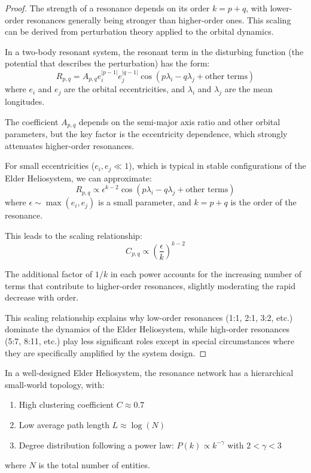 \begin{proof}
The strength of a resonance depends on its order $k = p + q$, with lower-order resonances generally being stronger than higher-order ones. This scaling can be derived from perturbation theory applied to the orbital dynamics.

In a two-body resonant system, the resonant term in the disturbing function (the potential that describes the perturbation) has the form:
\begin{equation}
R_{p,q} = A_{p,q} e_i^{|p-1|} e_j^{|q-1|} \cos(p\lambda_i - q\lambda_j + \text{other terms})
\end{equation}
where $e_i$ and $e_j$ are the orbital eccentricities, and $\lambda_i$ and $\lambda_j$ are the mean longitudes.

The coefficient $A_{p,q}$ depends on the semi-major axis ratio and other orbital parameters, but the key factor is the eccentricity dependence, which strongly attenuates higher-order resonances.

For small eccentricities ($e_i, e_j \ll 1$), which is typical in stable configurations of the Elder Heliosystem, we can approximate:
\begin{equation}
R_{p,q} \propto \epsilon^{k-2} \cos(p\lambda_i - q\lambda_j + \text{other terms})
\end{equation}
where $\epsilon \sim \max(e_i, e_j)$ is a small parameter, and $k = p + q$ is the order of the resonance.

This leads to the scaling relationship:
\begin{equation}
C_{p,q} \propto \left(\frac{\epsilon}{k}\right)^{k-2}
\end{equation}

The additional factor of $1/k$ in each power accounts for the increasing number of terms that contribute to higher-order resonances, slightly moderating the rapid decrease with order.

This scaling relationship explains why low-order resonances (1:1, 2:1, 3:2, etc.) dominate the dynamics of the Elder Heliosystem, while high-order resonances (5:7, 8:11, etc.) play less significant roles except in special circumstances where they are specifically amplified by the system design.
\end{proof}

\begin{theorem}
In a well-designed Elder Heliosystem, the resonance network has a hierarchical small-world topology, with:
\begin{enumerate}
    \item High clustering coefficient $C \approx 0.7$
    \item Low average path length $L \approx \log(N)$
    \item Degree distribution following a power law: $P(k) \propto k^{-\gamma}$ with $2 < \gamma < 3$
\end{enumerate}
where $N$ is the total number of entities.
\end{theorem}

